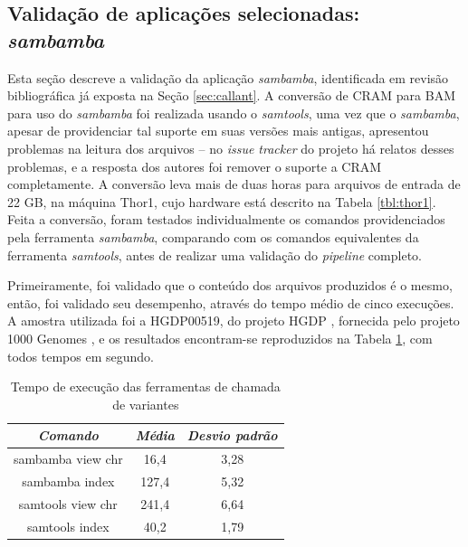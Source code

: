 \documentclass[cic,tc]{iiufrgs}
\begin{document}
\subsection{Validação de aplicações selecionadas: \textit{sambamba}}
\label{sec:sambamba}

Esta seção descreve a validação da aplicação \textit{sambamba}, identificada em revisão
bibliográfica já exposta na Seção \ref{sec:callant}. A conversão de CRAM para
BAM para uso do \textit{sambamba} foi realizada usando o \textit{samtools}, uma vez que o
\textit{sambamba}, apesar de providenciar tal suporte em suas versões mais antigas,
apresentou problemas na leitura dos arquivos -- no \textit{issue tracker} do
projeto há relatos desses problemas, e a resposta dos autores foi remover o
suporte a CRAM completamente. A conversão leva mais de duas horas para arquivos
de entrada de 22 GB, na máquina Thor1, cujo hardware está descrito na
Tabela \ref{tbl:thor1}. Feita a conversão, foram testados individualmente os
comandos providenciados pela ferramenta \textit{sambamba}, comparando com os comandos
equivalentes da ferramenta \textit{samtools}, antes de realizar uma validação
do \textit{pipeline} completo. 

Primeiramente, foi validado que o conteúdo dos arquivos produzidos é o mesmo,
então, foi validado seu desempenho, através do tempo médio de cinco execuções.
A amostra utilizada foi a HGDP00519, do projeto HGDP \cite{cavalli2005human},
fornecida pelo projeto 1000 Genomes \cite{via20101000}, e os resultados
encontram-se reproduzidos na Tabela \ref{tbl:sambamba}, com todos tempos em segundo.

\begin{table}[h]
    \caption{Tempo de execução das ferramentas de chamada de variantes}
    \centering
        \begin{tabular}{c|c|c}
          \hline
          \textit{Comando}  &   \textit{Média}  & \textit{Desvio padrão} \\
          \hline
          \hline
          sambamba view chr & 16,4  & 3,28 \\
          sambamba index    & 127,4 & 5,32 \\
          samtools view chr & 241,4 & 6,64 \\
          samtools index    & 40,2  & 1,79 \\
          \hline
        \end{tabular}
    \label{tbl:sambamba}
\end{table}
\end{document}
